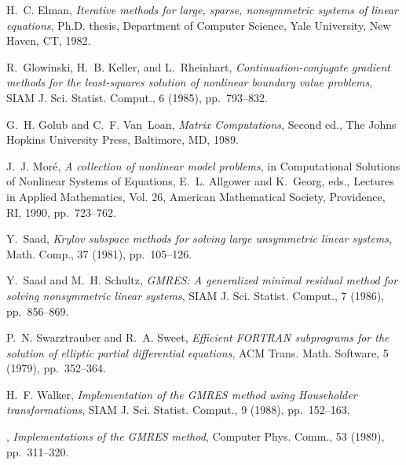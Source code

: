 \documentclass{SIAMGHbook2016}
\begin{document}
\begin{thebibliography}{10}
{\sc H.~C. Elman}, {\em Iterative methods for large, sparse, nonsymmetric
  systems of linear equations}, Ph.D. thesis, Department of Computer
  Science, Yale University, New Haven, CT, 1982.

{\sc R.~Glowinski, H.~B. Keller, and L.~Rheinhart}, {\em Continuation-conjugate
  gradient methods for the least-squares solution of nonlinear boundary value
  problems}, SIAM J. Sci. Statist. Comput., 6 (1985), pp.~793--832.

{\sc G.~H. Golub and C.~F. Van~Loan}, {\em Matrix Computations},
  Second ed., The Johns  Hopkins University Press, Baltimore, MD,  1989.

{\sc J.~J. Mor\'e}, {\em A collection of nonlinear model problems}, in
  Computational Solutions of Nonlinear Systems of Equations, E.~L. Allgower and
  K.~Georg, eds., Lectures in Applied Mathematics, Vol. 26, American
  Mathematical Society, Providence, RI, 1990, pp.~723--762.

{\sc Y.~Saad}, {\em Krylov subspace methods for solving large unsymmetric
  linear systems}, Math. Comp., 37 (1981), pp.~105--126.

{\sc Y.~Saad and M.~H. Schultz}, {\em {\rm GMRES}: A generalized minimal
  residual method for solving nonsymmetric linear systems}, SIAM J. Sci. Statist.
  Comput., 7 (1986), pp.~856--869.

{\sc P.~N. Swarztrauber and R.~A. Sweet}, {\em Efficient {\rm FORTRAN}
  subprograms for the solution of elliptic partial differential equations}, ACM
  Trans. Math. Software, 5 (1979), pp.~352--364.

{\sc H.~F. Walker}, {\em Implementation of the {\rm GMRES} method using
  {H}ouseholder transformations}, SIAM J. Sci. Statist. Comput., 9 (1988),
  pp.~152--163.

\sameauthor, {\em Implementations of
  the {\rm GMRES} method}, Computer Phys. Comm., 53 (1989),  pp.~311--320.

\end{thebibliography}
\cleardoublepage

\printindex
\end{document}
